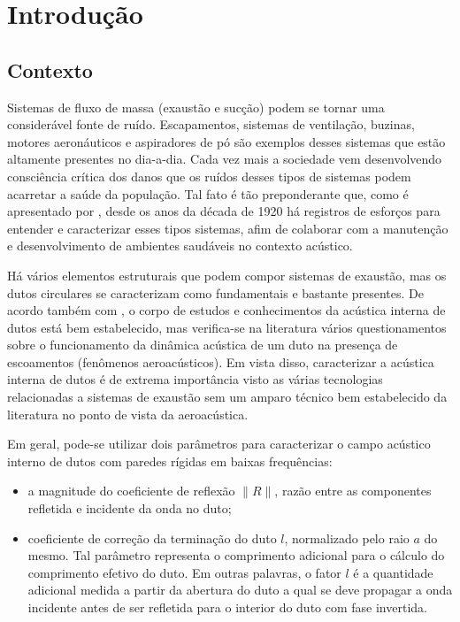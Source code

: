 \chapter{Introdução}
\label{chapter:introdcao}

\section{Contexto}

Sistemas de fluxo de massa (exaustão e sucção) podem se tornar uma considerável fonte de ruído. Escapamentos, sistemas de ventilação, buzinas, motores aeronáuticos e aspiradores de pó são exemplos desses sistemas que estão altamente presentes no dia-a-dia. Cada vez mais a sociedade vem desenvolvendo consciência crítica dos danos que os ruídos desses tipos de sistemas podem acarretar a saúde da população. Tal fato é tão preponderante que, como é apresentado por , desde os anos da década de 1920 há registros de esforços para entender e caracterizar esses tipos sistemas, afim de colaborar com a manutenção e desenvolvimento de ambientes saudáveis no contexto acústico.

Há vários elementos estruturais que podem compor sistemas de exaustão, mas os dutos circulares se caracterizam como fundamentais e bastante presentes. De acordo também com , o corpo de estudos e conhecimentos da acústica interna de dutos está bem estabelecido, mas verifica-se na literatura vários questionamentos sobre o funcionamento da dinâmica acústica de um duto na presença de escoamentos (fenômenos aeroacústicos). Em vista disso, caracterizar a acústica interna de dutos é de extrema importância visto as várias tecnologias relacionadas a sistemas de exaustão sem um amparo técnico bem estabelecido da literatura no ponto de vista da aeroacústica.

Em geral, pode-se utilizar dois parâmetros para caracterizar o campo acústico interno de dutos com paredes rígidas em baixas frequências:

\begin{itemize}
    \item a magnitude do coeficiente de reflexão $\|R\|$, razão entre as componentes refletida e incidente da onda no duto;
    

    \item coeficiente de correção da terminação do duto $l$, normalizado pelo raio $a$ do mesmo. Tal parâmetro representa o comprimento adicional para o cálculo do comprimento efetivo do duto. Em outras palavras, o fator $l$ é a quantidade adicional medida a partir da abertura do duto a qual se deve propagar a onda incidente antes de ser refletida para o interior do duto com fase invertida.
\end{itemize}

